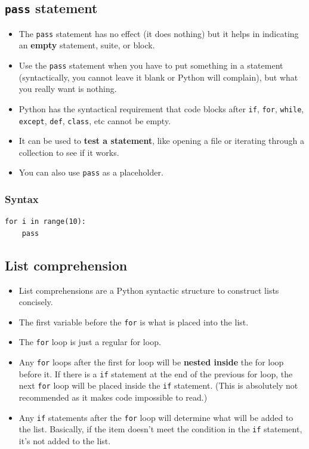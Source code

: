 \documentclass[11pt]{article}
\begin{document}
\subsection{\texttt{pass} statement}
\label{sec:org423abc9}
\begin{itemize}
\item The \texttt{pass} statement has no effect (it does nothing) but it helps in indicating an \textbf{empty} statement, suite, or block.
\item Use the \texttt{pass} statement when you have to put something in a statement (syntactically, you cannot leave it blank or Python will complain), but what you really want is nothing.
\item Python has the syntactical requirement that code blocks after \texttt{if}, \texttt{for}, \texttt{while}, \texttt{except}, \texttt{def}, \texttt{class}, etc cannot be empty.
\item It can be used to \textbf{test a statement}, like opening a file or iterating through a collection to see if it works.
\item You can also use \texttt{pass} as a placeholder.
\end{itemize}

\subsubsection{Syntax}
\label{sec:org4d708ea}
\begin{verbatim}
for i in range(10):
    pass
\end{verbatim}

 \newpage

\subsection{List comprehension}
\label{sec:org820882b}
\begin{itemize}
\item List comprehensions are a Python syntactic structure to construct lists concisely.
\item The first variable before the \texttt{for} is what is placed into the list.
\item The \texttt{for} loop is just a regular for loop.
\item Any \texttt{for} loops after the first for loop will be \textbf{nested inside} the for loop before it. If there is a \texttt{if} statement at the end of the previous for loop, the next \texttt{for} loop will be placed inside the \texttt{if} statement. (This is absolutely not recommended as it makes code impossible to read.)
\item Any \texttt{if} statements after the \texttt{for} loop will determine what will be added to the list. Basically, if the item doesn't meet the condition in the \texttt{if} statement, it's not added to the list.
\end{itemize}
\end{document}
